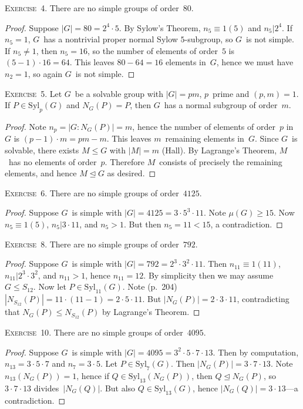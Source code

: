 \documentclass[letterpaper]{article}
\newcommand{\exercise}[1]{\goodbreak\noindent\textsc{Exercise~{#1}.}}
\newcommand{\subgroup}{\le}
\newcommand{\normal}{\trianglelefteq}
\newcommand{\syl}{\mathrm{Syl}}
\newcommand{\ord}[1]{|{#1}|}
\newcommand{\gindex}[2]{|{#1}:{#2}|}
\newcommand{\mpsi}[1]{\mu({#1})}
\begin{document}
\exercise{4}
There are no simple groups of order~$80$.
\begin{proof}
Suppose $\ord{G}=80=2^4\cdot 5$. By Sylow's Theorem, $n_5\equiv 1(5)$ and $n_5|2^4$. If $n_5=1$, $G$~has a nontrivial proper normal Sylow $5$-subgroup, so $G$~is not simple. If $n_5\ne1$, then $n_5=16$, so the number of elements of order~$5$ is $(5-1)\cdot 16=64$. This leaves $80-64=16$ elements in~$G$, hence we must have $n_2=1$, so again $G$~is not simple.
\end{proof}

\exercise{5}
Let $G$~be a solvable group with $\ord{G}=pm$, $p$~prime and $(p,m)=1$. If $P\in\syl_p(G)$ and $N_G(P)=P$, then $G$~has a normal subgroup of order~$m$.
\begin{proof}
Note $n_p=\gindex{G}{N_G(P)}=m$, hence the number of elements of order~$p$ in~$G$ is $(p-1)\cdot m=pm-m$. This leaves $m$~remaining elements in~$G$. Since $G$~is solvable, there exists $M\subgroup G$ with $\ord{M}=m$ (Hall). By Lagrange's Theorem, $M$~has no elements of order~$p$. Therefore $M$~consists of precisely the remaining elements, and hence $M\normal G$ as desired. 
\end{proof}

\exercise{6}
There are no simple groups of order~$4125$.
\begin{proof}
Suppose $G$~is simple with $\ord{G}=4125=3\cdot 5^3\cdot 11$. Note $\mpsi{G}\ge 15$. Now $n_5\equiv 1(5)$, $n_5|3\cdot 11$, and $n_5>1$. But then $n_5=11<15$, a contradiction.
\end{proof}

\exercise{8}
There are no simple groups of order~$792$.
\begin{proof}
Suppose $G$~is simple with $\ord{G}=792=2^3\cdot 3^2\cdot 11$. Then $n_{11}\equiv 1(11)$, $n_{11}|2^3\cdot 3^2$, and $n_{11}>1$, hence $n_{11}=12$. By simplicity then we may assume $G\subgroup S_{12}$. Now let $P\in\syl_{11}(G)$. Note (p.~204) $\ord{N_{S_{12}}(P)}=11\cdot(11-1)=2\cdot 5\cdot 11$. But $\ord{N_G(P)}=2\cdot 3\cdot 11$, contradicting that $N_G(P)\subgroup N_{S_{12}}(P)$ by Lagrange's Theorem.
\end{proof}

\exercise{10}
There are no simple groups of order~$4095$.
\begin{proof}
Suppose $G$~is simple with $\ord{G}=4095=3^2\cdot 5\cdot 7\cdot 13$. Then by computation, $n_{13}=3\cdot 5\cdot 7$ and $n_7=3\cdot 5$. Let $P\in\syl_7(G)$. Then $\ord{N_G(P)}=3\cdot 7\cdot 13$. Note $n_{13}(N_G(P))=1$, hence if $Q\in\syl_{13}(N_G(P))$, then $Q\normal N_G(P)$, so $3\cdot 7\cdot 13$ divides~$\ord{N_G(Q)}$. But also $Q\in\syl_{13}(G)$, hence $\ord{N_G(Q)}=3\cdot 13$---a contradiction.
\end{proof}
\end{document}
